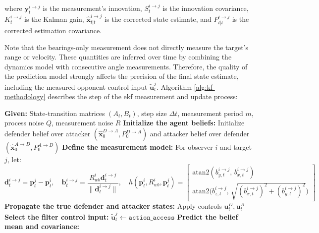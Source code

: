 where $\mathbf{y}^{i\to j}_t$ is the measurement's innovation, $S^{i\to j}_t$ is the innovation covariance, $K^{i\to j}_t$ is the Kalman gain, $\hat{\mathbf{x}}^{i\to j}_{t|t}$ is the corrected state estimate, and $P^{i\to j}_{t|t}$ is the corrected estimation covariance.

Note that the bearings-only measurement does not directly measure the target's range or velocity. These quantities are inferred over time by combining the dynamics model with consecutive angle measurements. Therefore, the quality of the prediction model strongly affects the precision of the final state estimate, including the measured opponent control input $\tilde{\mathbf{u}}^{j}_{t}$. Algorithm \ref{alg:kf-methodology} describes the step of the \acs{ekf} measurement and update process:


\begin{algorithm}[H]
\caption{Agent-Centric Bearing-Only \acs{ekf} Update}
\label{alg:kf-methodology}
\begin{algorithmic}[1]
\State \textbf{Given:} State-transition matrices $(A_t,B_t)$, step size $\Delta t$, measurement period $m$, process noise $Q$, measurement noise $R$
\State \textbf{Initialize the agent beliefs:}
\State \hspace{1em} Initialize defender belief over attacker $(\hat{\mathbf{x}}^{D \to A}_0 ,P^{D\to A}_0)$ and attacker belief over defender $(\hat{\mathbf{x}}^{A \to D}_0, P^{A\to D}_0)$
\State \textbf{Define the measurement model:}
\State \hspace{1em} For observer $i$ and target $j$, let:
\[
\mathbf{d}^{i \to j}_t = \mathbf{p}^j_t - \mathbf{p}^i_t ,\quad
\mathbf{b}^{i \to j}_t = \frac{R^i_{wb}\mathbf{d}^{i \to j}_t}{\|\mathbf{d}^{i \to j}_t\|},\quad
h(\mathbf{p}_t^i, R_{wb}^i, \mathbf{p}_t^j)=
\begin{bmatrix}
\mathrm{atan2}(b_{y,t}^{i\to j},\,b_{x,t}^{i\to j})\\[2pt]
\mathrm{atan2}\!\big(b_{z,t}^{i\to j},\,\sqrt{(b_{x,t}^{i\to j})^2+(b_{y,t}^{i\to j})^2}\big)
\end{bmatrix}
\]
  \State \textbf{Propagate the true defender and attacker states:}
  \State \hspace{1em} Apply controls $\mathbf{u}^D_t,\mathbf{u}^A_t$
    \State \textbf{Select the filter control input:}
    \State \hspace{1em} $\tilde{\mathbf{u}}^j_t\leftarrow \texttt{action\_access}$
    \State \textbf{Predict the belief mean and covariance:}

\end{algorithmic}
\end{algorithm}
